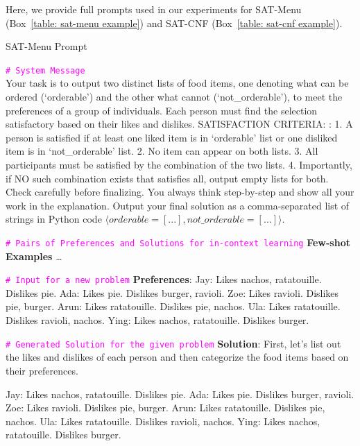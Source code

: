 \documentclass{article} %
\begin{document}
Here, we provide full prompts used in our experiments for SAT-Menu (Box~\ref{table: sat-menu example}) and SAT-CNF (Box~\ref{table: sat-cnf example}).

\begin{mybox}[label=table: sat-menu example]{SAT-Menu Prompt}
\footnotesize

\textcolor{magenta}{\texttt{\# System Message}}\\
Your task is to output two distinct lists of food items, one denoting what can be ordered (`orderable') and the other what cannot (`not\_orderable'), to meet the preferences of a group of individuals. Each person must find the selection satisfactory based on their likes and dislikes. SATISFACTION CRITERIA: : 1. A person is satisfied if at least one liked item is in `orderable' list or one disliked item is in `not\_orderable' list. 2. No item can appear on both lists. 3. All participants must be satisfied by the combination of the two lists. 4. Importantly, if NO such combination exists that satisfies all, output empty lists for both. Check carefully before finalizing. You always think step-by-step and show all your work in the explanation. Output your final solution as a comma-separated list of strings in Python code $\langle orderable=[...], not\_orderable=[...]\rangle$.\newline

\textcolor{magenta}{\texttt{\# Pairs of Preferences and Solutions for in-context learning}}\newline
\textbf{Few-shot Examples} \dots\newline

\textcolor{magenta}{\texttt{\# Input for a new problem}}\newline
\textbf{Preferences}: Jay: Likes nachos, ratatouille. Dislikes pie. Ada: Likes pie. Dislikes burger, ravioli. Zoe: Likes ravioli. Dislikes pie, burger. Arun: Likes ratatouille. Dislikes pie, nachos. Ula: Likes ratatouille. Dislikes ravioli, nachos. Ying: Likes nachos, ratatouille. Dislikes burger.\newline

\textcolor{magenta}{\texttt{\# Generated Solution for the given problem}}\newline
\textbf{Solution}: First, let's list out the likes and dislikes of each person and then categorize the food items based on their preferences.\newline

Jay: Likes nachos, ratatouille. Dislikes pie. \newline
Ada: Likes pie. Dislikes burger, ravioli. \newline
Zoe: Likes ravioli. Dislikes pie, burger. \newline
Arun: Likes ratatouille. Dislikes pie, nachos.\newline
Ula: Likes ratatouille. Dislikes ravioli, nachos.\newline
Ying: Likes nachos, ratatouille. Dislikes burger.\newline


\end{mybox}
\end{document}
